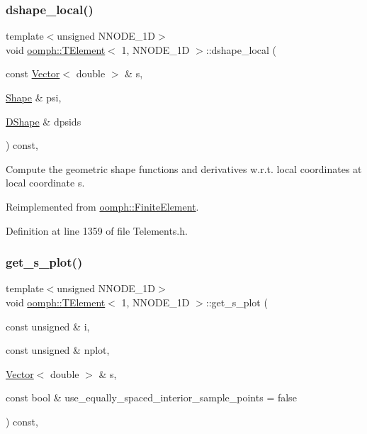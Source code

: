 \subsubsection{\texorpdfstring{dshape\+\_\+local()}{dshape\_local()}}
{\footnotesize\ttfamily template$<$unsigned N\+N\+O\+D\+E\+\_\+1D$>$ \\
void \hyperlink{classoomph_1_1TElement}{oomph\+::\+T\+Element}$<$ 1, N\+N\+O\+D\+E\+\_\+1D $>$\+::dshape\+\_\+local (\begin{DoxyParamCaption}\item[{const \hyperlink{classoomph_1_1Vector}{Vector}$<$ double $>$ \&}]{s,  }\item[{\hyperlink{classoomph_1_1Shape}{Shape} \&}]{psi,  }\item[{\hyperlink{classoomph_1_1DShape}{D\+Shape} \&}]{dpsids }\end{DoxyParamCaption}) const\hspace{0.3cm}{\ttfamily [inline]}, {\ttfamily [virtual]}}



Compute the geometric shape functions and derivatives w.\+r.\+t. local coordinates at local coordinate s. 



Reimplemented from \hyperlink{classoomph_1_1FiniteElement_a9db1456b827131c21a991ac9fedf4b0c}{oomph\+::\+Finite\+Element}.



Definition at line 1359 of file Telements.\+h.

\mbox{\label{classoomph_1_1TElement_3_011_00_01NNODE__1D_01_4_a4f438dcbac105993fee93a367d69f163}} 
\subsubsection{\texorpdfstring{get\+\_\+s\+\_\+plot()}{get\_s\_plot()}}
{\footnotesize\ttfamily template$<$unsigned N\+N\+O\+D\+E\+\_\+1D$>$ \\
void \hyperlink{classoomph_1_1TElement}{oomph\+::\+T\+Element}$<$ 1, N\+N\+O\+D\+E\+\_\+1D $>$\+::get\+\_\+s\+\_\+plot (\begin{DoxyParamCaption}\item[{const unsigned \&}]{i,  }\item[{const unsigned \&}]{nplot,  }\item[{\hyperlink{classoomph_1_1Vector}{Vector}$<$ double $>$ \&}]{s,  }\item[{const bool \&}]{use\+\_\+equally\+\_\+spaced\+\_\+interior\+\_\+sample\+\_\+points = {\ttfamily false} }\end{DoxyParamCaption}) const\hspace{0.3cm}{\ttfamily [inline]}, {\ttfamily [virtual]}}



